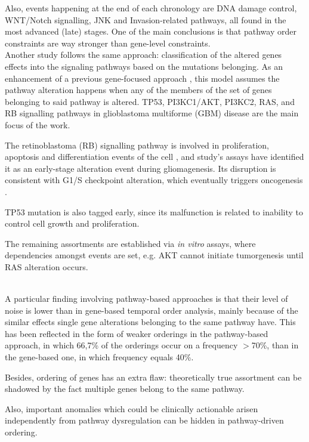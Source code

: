 Also, events happening at the end of each chronology are DNA damage control, WNT/Notch signalling, JNK and Invasion-related pathways, all found in the most advanced (late) stages.
One of the main conclusions is that pathway order constraints are way stronger than gene-level constraints.
\\

Another study \cite{Cheng2012AGliomagenesis} follows the same approach: classification of the altered genes effects into the signaling pathways based on the mutations belonging. As an enhancement of a previous gene-focused approach \cite{Attolini2010ACancer}, this model assumes the pathway alteration happens when any of the members of the set of genes belonging to said pathway is altered. TP53, PI3KC1/AKT, PI3KC2, RAS, and RB signalling pathways in glioblastoma multiforme (GBM) disease are the main focus of the work.

The retinoblastoma (RB) signalling pathway is involved in proliferation, apoptosis and differentiation events of the cell \cite{Du2012TheTherapeutics}, and study's assays have identified it as an early-stage alteration event during gliomagenesis. Its disruption is consistent with G1/S checkpoint alteration, which eventually triggers oncogenesis \cite{Bertoli2013ControlPhases}.

TP53 mutation is also tagged early, since its malfunction is related to inability to control cell growth and proliferation.

The remaining assortments are established via \emph{in vitro} assays, where dependencies amongst events are set, e.g. AKT cannot initiate tumorgenesis until RAS alteration occurs.

\\

A particular finding involving pathway-based approaches is that their level of noise is lower than in gene-based temporal order analysis, mainly because of the similar effects single gene alterations belonging to the same pathway have. This has been reflected in the form of weaker orderings in the pathway-based approach, in which 66,7\% of the orderings occur on a frequency $>$70\%, than in the gene-based one, in which frequency equals 40\%.

Besides, ordering of genes has an extra flaw: theoretically true assortment can be shadowed by the fact multiple genes belong to the same pathway.

Also, important anomalies which could be clinically actionable arisen independently from pathway dysregulation can be hidden in pathway-driven ordering.

